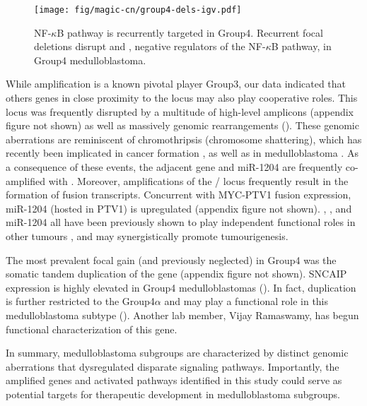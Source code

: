 \begin{SCfigure}[2]
	\centering
	\texttt{[image: fig/magic-cn/group4-dels-igv.pdf]}
	\caption[NF-$\kappa$B pathway is recurrently targeted in Group4]
	{
	NF-$\kappa$B pathway is recurrently targeted in Group4.
	Recurrent focal deletions disrupt  and , negative regulators of the NF-$\kappa$B pathway, in Group4 medulloblastoma.
	}
	\label{fig:group4-dels-igv}
\end{SCfigure}

While  amplification is a known pivotal player Group3, our data indicated that others genes in close proximity to the  locus may also play cooperative roles. This locus was frequently disrupted by a multitude of high-level amplicons (appendix figure not shown) as well as massively genomic rearrangements (). These genomic aberrations are reminiscent of chromothripsis (chromosome shattering), which has recently been implicated in cancer formation , as well as in medulloblastoma . As a consequence of these events, the adjacent  gene and miR-1204 are frequently co-amplified with . Moreover, amplifications of the / locus frequently result in the formation of fusion transcripts. Concurrent with MYC-PTV1 fusion expression, miR-1204 (hosted in PTV1) is upregulated (appendix figure not shown). , , and miR-1204 all have been previously shown to play independent functional roles in other tumours , and may synergistically promote tumourigenesis.

The most prevalent focal gain (and previously neglected) in Group4 was the somatic tandem duplication of the  gene (appendix figure not shown). SNCAIP expression is highly elevated in Group4 medulloblastomas (). In fact,  duplication is further restricted to the Group4$\alpha$ and may play a functional role in this medulloblastoma subtype (). Another lab member, Vijay Ramaswamy, has begun functional characterization of this gene.

In summary, medulloblastoma subgroups are characterized by distinct genomic aberrations that dysregulated disparate signaling pathways. Importantly, the amplified genes and activated pathways identified in this study could serve as potential targets for therapeutic development in medulloblastoma subgroups.


